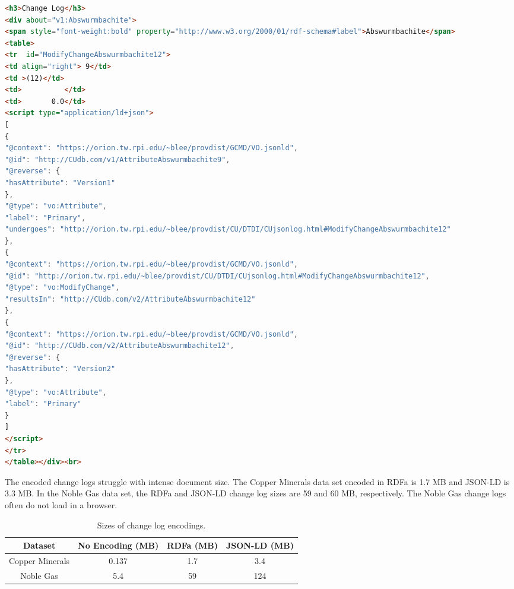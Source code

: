 \begin{lstlisting}[language=HTML, caption=Abswurmbachite JSON-LD, label=json_list]
<h3>Change Log</h3>
<div about="v1:Abswurmbachite">
<span style="font-weight:bold" property="http://www.w3.org/2000/01/rdf-schema#label">Abswurmbachite</span>
<table>
<tr  id="ModifyChangeAbswurmbachite12">
<td align="right"> 9</td>
<td >(12)</td>
<td>          </td>
<td>       0.0</td>
<script type="application/ld+json">
[
{
"@context": "https://orion.tw.rpi.edu/~blee/provdist/GCMD/VO.jsonld", 
"@id": "http://CUdb.com/v1/AttributeAbswurmbachite9", 
"@reverse": {
"hasAttribute": "Version1"
}, 
"@type": "vo:Attribute", 
"label": "Primary", 
"undergoes": "http://orion.tw.rpi.edu/~blee/provdist/CU/DTDI/CUjsonlog.html#ModifyChangeAbswurmbachite12"
}, 
{
"@context": "https://orion.tw.rpi.edu/~blee/provdist/GCMD/VO.jsonld", 
"@id": "http://orion.tw.rpi.edu/~blee/provdist/CU/DTDI/CUjsonlog.html#ModifyChangeAbswurmbachite12", 
"@type": "vo:ModifyChange", 
"resultsIn": "http://CUdb.com/v2/AttributeAbswurmbachite12"
}, 
{
"@context": "https://orion.tw.rpi.edu/~blee/provdist/GCMD/VO.jsonld", 
"@id": "http://CUdb.com/v2/AttributeAbswurmbachite12", 
"@reverse": {
"hasAttribute": "Version2"
}, 
"@type": "vo:Attribute", 
"label": "Primary"
}
]
</script>
</tr>
</table></div><br>
\end{lstlisting}

The encoded change logs struggle with intense document size.
The Copper Minerals data set encoded in RDFa is 1.7 MB and JSON-LD is 3.3 MB.
In the Noble Gas data set, the RDFa and JSON-LD change log sizes are 59 and 60 MB, respectively.
The Noble Gas change logs often do not load in a browser.

\begin{table}[b]
	\caption{Sizes of change log encodings.}
	\label{changelog_table}
	\centering
	\begin{tabular}{|c|c|c|c|}
		\hline
		Dataset & No Encoding (MB) & RDFa (MB) & JSON-LD (MB) \\
		\hline
		Copper Minerals & 0.137 & 1.7 & 3.4 \\
		Noble Gas & 5.4 & 59 & 124 \\
		\hline
	\end{tabular}
\end{table}

